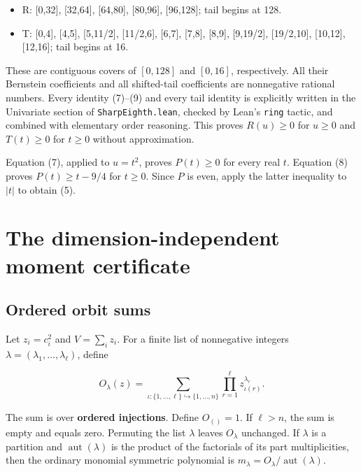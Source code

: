 \documentclass[11pt]{article}
\begin{document}
\begin{itemize}
\item
  R: {[}0,32{]}, {[}32,64{]}, {[}64,80{]}, {[}80,96{]}, {[}96,128{]};
  tail begins at 128.
\item
  T: {[}0,4{]}, {[}4,5{]}, {[}5,11/2{]}, {[}11/2,6{]}, {[}6,7{]},
  {[}7,8{]}, {[}8,9{]}, {[}9,19/2{]}, {[}19/2,10{]}, {[}10,12{]},
  {[}12,16{]}; tail begins at 16.
\end{itemize}

These are contiguous covers of \([0,128]\) and \([0,16]\), respectively.
All their Bernstein coefficients and all shifted-tail coefficients are
nonnegative rational numbers. Every identity (7)--(9) and every tail
identity is explicitly written in the Univariate section of
\texttt{SharpEighth.lean}, checked by Lean's \texttt{ring} tactic, and
combined with elementary order reasoning. This proves \(R(u)\ge0\) for
\(u\ge0\) and \(T(t)\ge0\) for \(t\ge0\) without approximation.

Equation (7), applied to \(u=t^2\), proves \(P(t)\ge0\) for every real
\(t\). Equation (8) proves \(P(t)\ge t-9/4\) for \(t\ge0\). Since \(P\)
is even, apply the latter inequality to \(|t|\) to obtain (5).

\section{The dimension-independent moment certificate}\label{the-dimension-independent-moment-certificate}

\subsection{Ordered orbit sums}\label{ordered-orbit-sums}

Let \(z_i=c_i^2\) and \(V=\sum_i z_i\). For a finite list of nonnegative
integers \(\lambda=(\lambda_1,\ldots,\lambda_\ell)\), define

\[O_\lambda(z)=\sum_{\iota:\{1,\ldots,\ell\}\hookrightarrow\{1,\ldots,n\}}
       \prod_{r=1}^{\ell}z_{\iota(r)}^{\lambda_r}. \tag{10}\]

The sum is over \textbf{ordered injections}. Define \(O_{()}=1\). If
\(\ell>n\), the sum is empty and equals zero. Permuting the list
\(\lambda\) leaves \(O_\lambda\) unchanged. If \(\lambda\) is a
partition and \(\operatorname{aut}(\lambda)\) is the product of the
factorials of its part multiplicities, then the ordinary monomial
symmetric polynomial is
\(m_\lambda=O_\lambda/\operatorname{aut}(\lambda)\).
\end{document}
